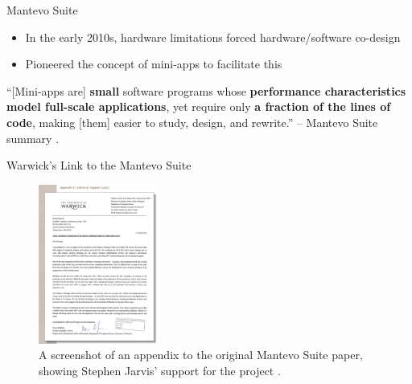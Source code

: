 \documentclass[10pt,aspectratio=169]{beamer}
\begin{document}
\begin{frame}{Mantevo Suite}
    \begin{itemize}
        \item In the early 2010s, hardware limitations forced hardware/software co-design
        \item Pioneered the concept of mini-apps to facilitate this
    \end{itemize}
    \vspace*{0.75cm}
    \begin{displayquote}
        \vspace{0.2cm}
        ``[Mini-apps are] \textbf{small} software programs whose \textbf{performance characteristics model full-scale applications}, yet require only \textbf{a fraction of the lines of code}, making [them] easier to study, design, and rewrite.'' -- Mantevo Suite summary \cite{heroux2013mantevo}.
    \end{displayquote}
\end{frame}

\begin{frame}{Warwick's Link to the Mantevo Suite}
    \begin{figure}[H]
        \includegraphics[width=0.35\textwidth]{images/warwick_mantevo_link.png}
        \caption{A screenshot of an appendix to the original Mantevo Suite paper, showing Stephen Jarvis' support for the project \cite{heroux2013mantevo}.}
        \label{fig:warwick_mantevo_link}
    \end{figure}
\end{frame}
\end{document}
